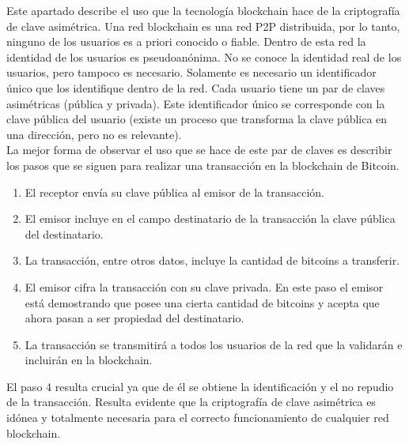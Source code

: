Este apartado describe el uso que la tecnología blockchain hace de la criptografía de clave asimétrica. Una red blockchain es una red P2P distribuida, por lo tanto, ninguno de los usuarios es a priori conocido o fiable. Dentro de esta red la identidad de los usuarios es pseudoanónima. No se conoce la identidad real de los usuarios, pero tampoco es necesario. Solamente es necesario un identificador único que los identifique dentro de la red. Cada usuario tiene un par de claves asimétricas (pública y privada). Este identificador único se corresponde con la clave pública del usuario (existe un proceso que transforma la clave pública en una dirección, pero no es relevante). \\
La mejor forma de observar el uso que se hace de este par de claves es describir los pasos que se siguen para realizar una transacción en la blockchain de Bitcoin.

\begin{enumerate}
	\item El receptor envía su clave pública al emisor de la transacción.
	\item El emisor incluye en el campo destinatario de la transacción la clave pública del destinatario.
	\item La transacción, entre otros datos, incluye la cantidad de bitcoins a transferir.
	\item El emisor cifra la transacción con su clave privada. En este paso el emisor está demostrando que posee una cierta cantidad de bitcoins y acepta que ahora pasan a ser propiedad del destinatario.
	\item La transacción se transmitirá a todos los usuarios de la red que la validarán e incluirán en la blockchain.
\end{enumerate}

El paso 4 resulta crucial ya que de él se obtiene la identificación y el no repudio de la transacción. Resulta evidente que la criptografía de clave asimétrica es idónea y totalmente necesaria para el correcto funcionamiento de cualquier red blockchain.

